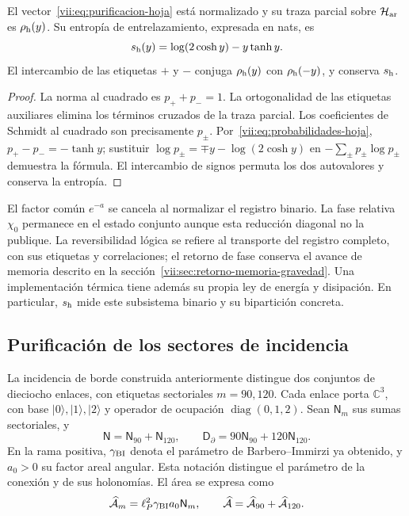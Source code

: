 \begin{proposition}
\label{vii:prop:purificacion-hoja}
El vector~\eqref{vii:eq:purificacion-hoja} está normalizado y su traza
parcial sobre \(\mathcal H_{\rm ar}\) es \(\rho_{\rm h}(y)\).
Su entropía de entrelazamiento, expresada en nats, es
\begin{equation}
 s_{\rm h}(y)=\log(2\cosh y)-y\tanh y.
 \label{vii:eq:entropia-hoja}
\end{equation}
El intercambio de las etiquetas \(+\) y \(-\) conjuga
\(\rho_{\rm h}(y)\) con \(\rho_{\rm h}(-y)\), y conserva
\(s_{\rm h}\).
\end{proposition}
\begin{proof}
La norma al cuadrado es \(p_++p_-=1\). La ortogonalidad de las
etiquetas auxiliares elimina los términos cruzados de la traza parcial.
Los coeficientes de Schmidt al cuadrado son precisamente \(p_\pm\).
Por~\eqref{vii:eq:probabilidades-hoja},
\(p_+-p_-=-\tanh y\); sustituir
\(\log p_\pm=\mp y-\log(2\cosh y)\) en
\(-\sum_\pm p_\pm\log p_\pm\) demuestra la fórmula.
El intercambio de signos permuta los dos autovalores y conserva la entropía.
\end{proof}

El factor común \(e^{-a}\) se cancela al normalizar el registro binario.
La fase relativa \(\chi_0\) permanece en el estado conjunto aunque esta
reducción diagonal no la publique. La reversibilidad lógica se refiere
al transporte del registro completo, con sus etiquetas y correlaciones;
el retorno de fase conserva el avance de memoria descrito en la
sección~\ref{vii:sec:retorno-memoria-gravedad}. Una implementación térmica
tiene además su propia ley de energía y disipación. En particular,
\(s_{\rm h}\) mide este subsistema binario y su bipartición concreta.

\subsection{Purificación de los sectores de incidencia}
\label{vii:subsec:purificacion-sectorial}

La incidencia de borde construida anteriormente distingue dos conjuntos
de dieciocho enlaces, con etiquetas sectoriales \(m=90,120\). Cada enlace
porta \(\mathbb C^3\), con base \(|0\rangle,|1\rangle,|2\rangle\)
y operador de ocupación \(\operatorname{diag}(0,1,2)\). Sean
\(\mathsf N_m\) sus sumas sectoriales, y
\begin{equation}
 \mathsf N=\mathsf N_{90}+\mathsf N_{120},\qquad
 \mathsf D_\partial=90\mathsf N_{90}+120\mathsf N_{120}.
 \label{vii:eq:ocupaciones-sectoriales}
\end{equation}
En la rama positiva, \(\gamma_{\rm BI}\) denota el parámetro de
Barbero--Immirzi ya obtenido, y \(a_0>0\) su factor areal angular.
Esta notación distingue el parámetro de la conexión y de sus holonomías.
El área se expresa como
\begin{equation}
 \widehat{\mathcal A}_m=\ell_P^2\gamma_{\rm BI}a_0\mathsf N_m,
 \qquad
 \widehat{\mathcal A}=\widehat{\mathcal A}_{90}
                         +\widehat{\mathcal A}_{120}.
 \label{vii:eq:area-sectores}
\end{equation}

